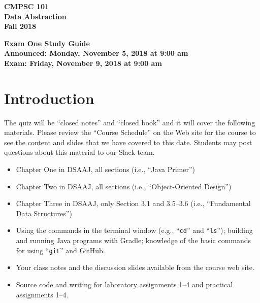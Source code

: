 \documentclass[11pt]{article}
\newcommand{\assignmentduedate}{November 9}
\newcommand{\assignmentassignedate}{November 5}
\newcommand{\assignmentnumber}{One}
\newcommand{\labyear}{2018}
\newcommand{\assignedday}{Monday}
\newcommand{\dueday}{Friday}
\newcommand{\labtime}{9:00 am}
\newcommand{\assigneddate}{Announced: \assignedday, \assignmentassignedate, \labyear{} at \labtime{}}
\newcommand{\duedate}{Exam: \dueday, \assignmentduedate, \labyear{} at \labtime{}}
\newcommand{\command}[1]{``\lstinline{#1}''}
\newcommand{\guidetitle}[1]
{
  \begin{center}
    \begin{center}
      \bf
      CMPSC 101\\Data Abstraction\\
      Fall 2018\\
      \medskip
    \end{center}
    \bf
    #1
  \end{center}
}
\begin{document}
\thispagestyle{empty}

\guidetitle{Exam \assignmentnumber{} Study Guide \\ \assigneddate{} \\ \duedate{}}

\section*{Introduction}

\noindent The quiz will be ``closed notes'' and ``closed book'' and it will
cover the following materials. Please review the ``Course Schedule'' on the Web
site for the course to see the content and slides that we have covered to this
date. Students may post questions about this material to our Slack team.

\begin{itemize}

  \itemsep 0in

  \item Chapter One in DSAAJ, all sections (i.e., ``Java Primer'')

  \item Chapter Two in DSAAJ, all sections (i.e., ``Object-Oriented Design'')

  \item Chapter Three in DSAAJ, only Section 3.1 and 3.5--3.6 (i.e.,
    ``Fundamental Data Structures'')



  \item Using the commands in the terminal window (e.g., \command{cd} and
    \command{ls}); building and running Java programs with Gradle; knowledge of
    the basic commands for using \command{git} and GitHub.

  \item Your class notes and the discussion slides available from the course web
    site.

  \item Source code and writing for laboratory assignments 1--4 and practical
    assignments 1--4.

\end{itemize}
\end{document}
